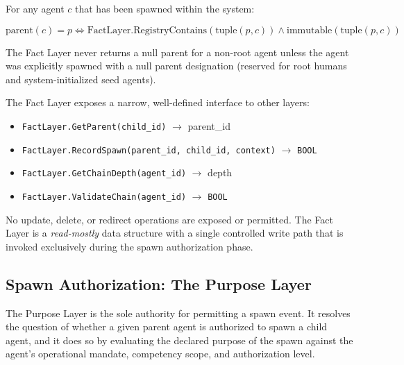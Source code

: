 \begin{invariant}
\label{inv:fact-layer-integrity}
For any agent $c$ that has been spawned within the system:

\[
\text{parent}(c) = p \iff \text{FactLayer.RegistryContains}(\text{tuple}(p, c)) \land \text{immutable}(\text{tuple}(p, c))
\]

The Fact Layer never returns a null parent for a non-root agent unless the agent was explicitly spawned with a null parent designation (reserved for root humans and system-initialized seed agents).
\end{invariant}

The Fact Layer exposes a narrow, well-defined interface to other layers:

\begin{itemize}
\item \texttt{FactLayer.GetParent(child\_id)} $\rightarrow$ parent\_id 
\item \texttt{FactLayer.RecordSpawn(parent\_id, child\_id, context)} $\rightarrow$ \texttt{BOOL} 
\item \texttt{FactLayer.GetChainDepth(agent\_id)} $\rightarrow$ depth 
\item \texttt{FactLayer.ValidateChain(agent\_id)} $\rightarrow$ \texttt{BOOL} 
\end{itemize}

No update, delete, or redirect operations are exposed or permitted. The Fact Layer is a \emph{read-mostly} data structure with a single controlled write path that is invoked exclusively during the spawn authorization phase.

\subsection{Spawn Authorization: The Purpose Layer}
\label{sec:purpose-layer-authorization}

The Purpose Layer is the sole authority for permitting a spawn event. It resolves the question of whether a given parent agent is authorized to spawn a child agent, and it does so by evaluating the declared purpose of the spawn against the agent's operational mandate, competency scope, and authorization level.

